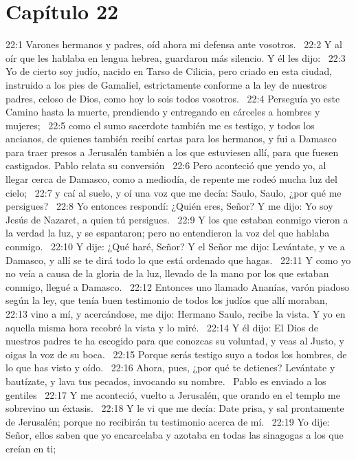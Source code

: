 \section*{Capítulo 22}

22:1 Varones hermanos y padres, oíd ahora mi defensa ante vosotros.  
22:2 Y al oír que les hablaba en lengua hebrea, guardaron más silencio. Y él les dijo:  
22:3 Yo de cierto soy judío, nacido en Tarso de Cilicia, pero criado en esta ciudad, instruido a los pies de Gamaliel, estrictamente conforme a la ley de nuestros padres, celoso de Dios, como hoy lo sois todos vosotros.  
22:4 Perseguía yo este Camino hasta la muerte, prendiendo y entregando en cárceles a hombres y mujeres;  
22:5 como el sumo sacerdote también me es testigo, y todos los ancianos, de quienes también recibí cartas para los hermanos, y fui a Damasco para traer presos a Jerusalén también a los que estuviesen allí, para que fuesen castigados. 
Pablo relata su conversión   
22:6 Pero aconteció que yendo yo, al llegar cerca de Damasco, como a mediodía, de repente me rodeó mucha luz del cielo;  
22:7 y caí al suelo, y oí una voz que me decía: Saulo, Saulo, ¿por qué me persigues?  
22:8 Yo entonces respondí: ¿Quién eres, Señor? Y me dijo: Yo soy Jesús de Nazaret, a quien tú persigues.  
22:9 Y los que estaban conmigo vieron a la verdad la luz, y se espantaron; pero no entendieron la voz del que hablaba conmigo.  
22:10 Y dije: ¿Qué haré, Señor? Y el Señor me dijo: Levántate, y ve a Damasco, y allí se te dirá todo lo que está ordenado que hagas.  
22:11 Y como yo no veía a causa de la gloria de la luz, llevado de la mano por los que estaban conmigo, llegué a Damasco.  
22:12 Entonces uno llamado Ananías, varón piadoso según la ley, que tenía buen testimonio de todos los judíos que allí moraban,  
22:13 vino a mí, y acercándose, me dijo: Hermano Saulo, recibe la vista. Y yo en aquella misma hora recobré la vista y lo miré.  
22:14 Y él dijo: El Dios de nuestros padres te ha escogido para que conozcas su voluntad, y veas al Justo, y oigas la voz de su boca.  
22:15 Porque serás testigo suyo a todos los hombres, de lo que has visto y oído.  
22:16 Ahora, pues, ¿por qué te detienes? Levántate y bautízate, y lava tus pecados, invocando su nombre.  
Pablo es enviado a los gentiles  
22:17 Y me aconteció, vuelto a Jerusalén, que orando en el templo me sobrevino un éxtasis.  
22:18 Y le vi que me decía: Date prisa, y sal prontamente de Jerusalén; porque no recibirán tu testimonio acerca de mí.  
22:19 Yo dije: Señor, ellos saben que yo encarcelaba y azotaba en todas las sinagogas a los que creían en ti;  
